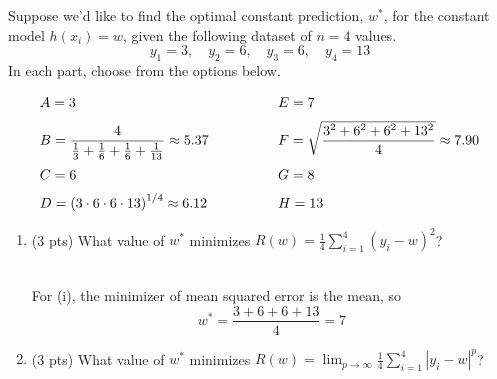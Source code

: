 \documentclass[11pt]{article}
\begin{document}
\begin{prob}
Suppose we'd like to find the optimal constant prediction, $w^*$,
for the constant model $h(x_i) = w$, given the following dataset of $n = 4$ values.
$$y_1 = 3, \quad y_2 = 6, \quad y_3 = 6, \quad y_4 = 13$$
In each part, choose from the options below.

\[
\begin{array}{l@{\hspace{1.75cm}}l}
A = 3 & E = 7 \\[1.5ex]
B = \dfrac{4}{\frac{1}{3} + \frac{1}{6} + \frac{1}{6} + \frac{1}{13}} \approx 5.37 & F = \sqrt{\dfrac{3^2 + 6^2 + 6^2 + 13^2}{4}} \approx 7.90 \\[3ex]
C = 6 & G = 8 \\[1.5ex]
D = \left( 3 \cdot 6 \cdot 6 \cdot 13 \right)^{1/4} \approx 6.12 & H = 13 \\
\end{array}
\]

\begin{enumerate}[label=(\roman*)]
\item (3 pts) What value of $w^*$ minimizes $R(w) = \displaystyle \frac{1}{4} \sum_{i=1}^4 (y_i - w)^2$? \\

        \\

\begin{solution}
For (i), the minimizer of mean squared error is the mean, so
\[
w^* = \frac{3+6+6+13}{4} = \boxed{7}
\]
\end{solution}


\item (3 pts) What value of $w^*$ minimizes $R(w) = \displaystyle \lim_{p \to \infty} \displaystyle \frac{1}{4} \sum_{i=1}^4 |y_i - w|^p$? \\
        \\


\end{enumerate}
\end{prob}
\end{document}
